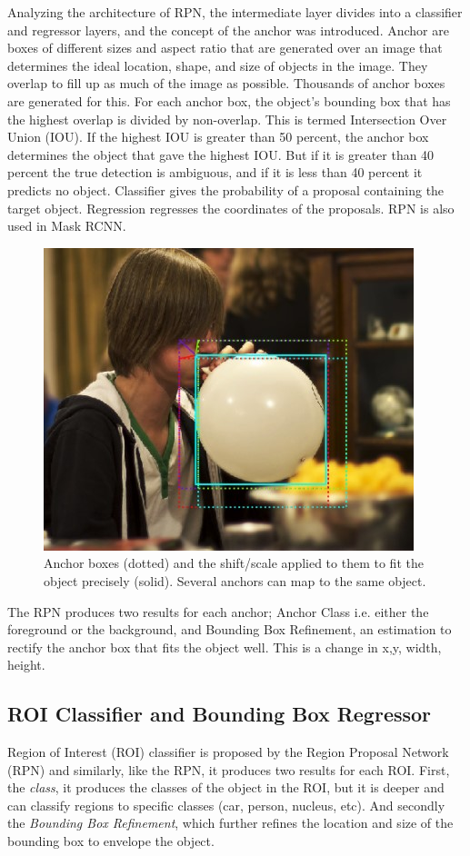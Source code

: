 Analyzing the architecture of RPN, the intermediate layer divides into a classifier and regressor layers, and the concept of the anchor was introduced. Anchor are boxes of different sizes and aspect ratio that are generated over an image that determines the ideal location, shape, and size of objects in the image. They overlap to fill up as much of the image as possible. Thousands of anchor boxes are generated for this. For each anchor box, the object’s bounding box that has the highest overlap is divided by non-overlap. This is termed Intersection Over Union (IOU). If the highest IOU is greater than 50 percent, the anchor box determines the object that gave the highest IOU. But if it is greater than 40 percent the true detection is ambiguous, and if it is less than 40 percent it predicts no object. Classifier gives the probability of a proposal containing the target object. Regression regresses the coordinates of the proposals. RPN is also used in Mask RCNN.
\begin{figure}
\centering
  \includegraphics[width=0.5\linewidth]{images/ballon.jpg}
   \caption{Anchor boxes (dotted) and the shift/scale applied to them to fit the object precisely (solid). Several anchors can map to the same object.}
\end{figure}

The RPN produces two results for each anchor; Anchor Class i.e. either the foreground or the background, and Bounding Box Refinement, an estimation to rectify the anchor box that fits the object well. This is a change in x,y, width, height.

\subsection{ROI Classifier and Bounding Box Regressor}
Region of Interest (ROI) classifier is proposed by the Region Proposal Network (RPN) and similarly, like the RPN, it produces two results for each ROI. First, the \textit{class}, it produces the classes of the object in the ROI, but it is deeper and can classify regions to specific classes (car, person, nucleus, etc). And secondly the\textit{ Bounding Box Refinement}, which further refines the location and size of the bounding box to envelope the object.

